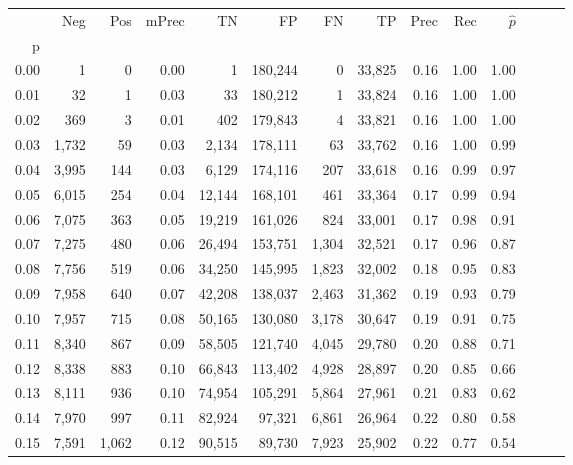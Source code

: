 \begin{tabular}{rrrrrrrrrrrrrr}
\toprule
{} &    Neg &    Pos & mPrec &       TN &       FP &      FN &      TP &  Prec &   Rec & $\hat{p}$ \\
p    &        &        &       &          &          &         &         &       &       &           \\
\midrule
0.00 &      1 &      0 &  0.00 &        1 &  180,244 &       0 &  33,825 &  0.16 &  1.00 &      1.00 \\
0.01 &     32 &      1 &  0.03 &       33 &  180,212 &       1 &  33,824 &  0.16 &  1.00 &      1.00 \\
0.02 &    369 &      3 &  0.01 &      402 &  179,843 &       4 &  33,821 &  0.16 &  1.00 &      1.00 \\
0.03 &  1,732 &     59 &  0.03 &    2,134 &  178,111 &      63 &  33,762 &  0.16 &  1.00 &      0.99 \\
0.04 &  3,995 &    144 &  0.03 &    6,129 &  174,116 &     207 &  33,618 &  0.16 &  0.99 &      0.97 \\
0.05 &  6,015 &    254 &  0.04 &   12,144 &  168,101 &     461 &  33,364 &  0.17 &  0.99 &      0.94 \\
0.06 &  7,075 &    363 &  0.05 &   19,219 &  161,026 &     824 &  33,001 &  0.17 &  0.98 &      0.91 \\
0.07 &  7,275 &    480 &  0.06 &   26,494 &  153,751 &   1,304 &  32,521 &  0.17 &  0.96 &      0.87 \\
0.08 &  7,756 &    519 &  0.06 &   34,250 &  145,995 &   1,823 &  32,002 &  0.18 &  0.95 &      0.83 \\
0.09 &  7,958 &    640 &  0.07 &   42,208 &  138,037 &   2,463 &  31,362 &  0.19 &  0.93 &      0.79 \\
0.10 &  7,957 &    715 &  0.08 &   50,165 &  130,080 &   3,178 &  30,647 &  0.19 &  0.91 &      0.75 \\
0.11 &  8,340 &    867 &  0.09 &   58,505 &  121,740 &   4,045 &  29,780 &  0.20 &  0.88 &      0.71 \\
0.12 &  8,338 &    883 &  0.10 &   66,843 &  113,402 &   4,928 &  28,897 &  0.20 &  0.85 &      0.66 \\
0.13 &  8,111 &    936 &  0.10 &   74,954 &  105,291 &   5,864 &  27,961 &  0.21 &  0.83 &      0.62 \\
0.14 &  7,970 &    997 &  0.11 &   82,924 &   97,321 &   6,861 &  26,964 &  0.22 &  0.80 &      0.58 \\
0.15 &  7,591 &  1,062 &  0.12 &   90,515 &   89,730 &   7,923 &  25,902 &  0.22 &  0.77 &      0.54 \\

\end{tabular}
